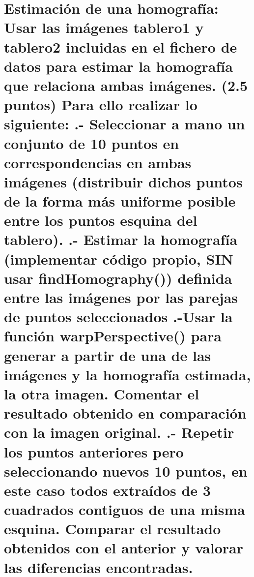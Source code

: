 \section{Estimación de una homografía: Usar las imágenes tablero1 y tablero2
incluidas en el fichero de datos para estimar la homografía que relaciona
ambas imágenes. (2.5 puntos) \newline
Para ello realizar lo siguiente: .- Seleccionar a mano un conjunto de 10 puntos en correspondencias
en ambas imágenes (distribuir dichos puntos de la forma más uniforme posible
entre los puntos esquina del tablero). .- Estimar la homografía (implementar código propio, SIN usar
findHomography()) definida entre las imágenes por las parejas de puntos
seleccionados .-Usar la función warpPerspective() para generar a partir de una de las
imágenes y la homografía estimada, la otra imagen. Comentar el resultado
obtenido en comparación con la imagen original. .- Repetir los puntos anteriores pero seleccionando nuevos 10 puntos,
en este caso todos extraídos de 3 cuadrados contiguos de una misma esquina.
Comparar el resultado obtenidos con el anterior y valorar las diferencias
encontradas.}

